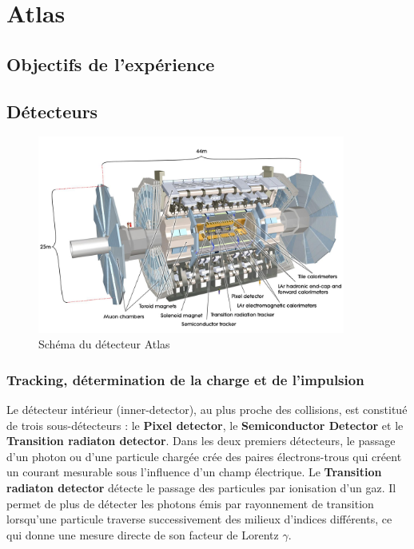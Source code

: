 \documentclass[11pt]{article} %
\begin{document}


\section{Atlas}



\subsection{Objectifs de l'expérience}

\subsection{Détecteurs}

\begin{figure}[H]
\centering
  \caption{\label{fig:atlas_detector}Schéma du détecteur Atlas}
 \includegraphics[width=0.9\textwidth]{../images/figures_AtlasDetectorLabelled.png}
\end{figure}

\subsubsection{Tracking, détermination de la charge et de l'impulsion}

Le détecteur intérieur (inner-detector), au plus proche des collisions, est constitué de trois sous-détecteurs : le \textbf{Pixel detector}, le \textbf{Semiconductor Detector} et le \textbf{Transition radiaton detector}. Dans les deux premiers détecteurs, le passage d'un photon ou d'une particule chargée crée des paires électrons-trous qui créent un courant mesurable sous l'influence d'un champ électrique. 
Le \textbf{Transition radiaton detector} détecte le passage des particules par ionisation d'un gaz. Il permet de plus de détecter les photons émis par rayonnement de transition lorsqu'une particule traverse successivement des milieux d'indices différents, ce qui donne une mesure directe de son facteur de Lorentz $\gamma$.
\end{document}
